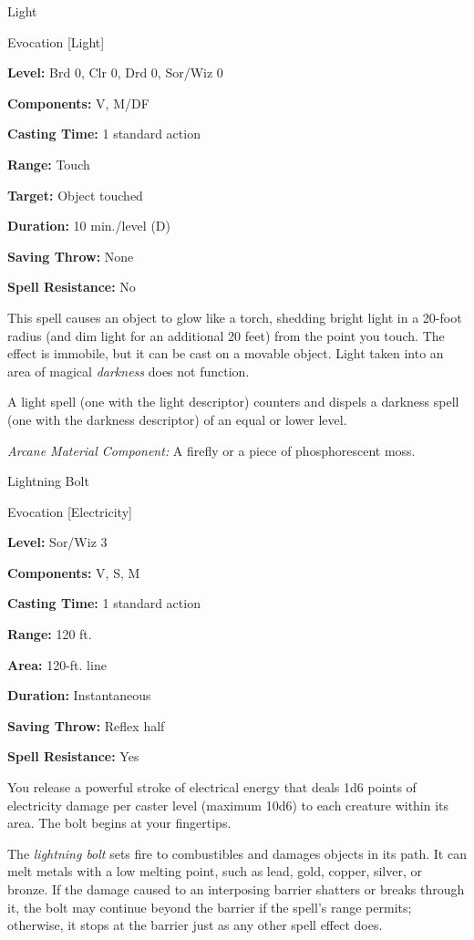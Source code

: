 \documentclass{article}
\begin{document}
\vspace{12pt}
Light

Evocation [Light]

\textbf{Level:} Brd 0, Clr 0, Drd 0, Sor/Wiz 0

\textbf{Components:} V, M/DF

\textbf{Casting Time:} 1 standard action

\textbf{Range:} Touch

\textbf{Target:} Object touched

\textbf{Duration:} 10 min./level (D)

\textbf{Saving Throw:} None

\textbf{Spell Resistance:} No

This spell causes an object to glow like a torch, shedding bright light in a 20-foot 
radius (and dim light for an additional 20 feet) from the point you touch. The 
effect is immobile, but it can be cast on a movable object. Light taken into an 
area of magical \textit{darkness }does not function.

A light spell (one with the light descriptor) counters and dispels a darkness spell 
(one with the darkness descriptor) of an equal or lower level.

\textit{Arcane Material Component: }A firefly or a piece of phosphorescent moss.

\vspace{12pt}
Lightning Bolt

Evocation [Electricity]

\textbf{Level:} Sor/Wiz 3

\textbf{Components:} V, S, M

\textbf{Casting Time:} 1 standard action

\textbf{Range:} 120 ft.

\textbf{Area:} 120-ft. line

\textbf{Duration:} Instantaneous

\textbf{Saving Throw:} Reflex half

\textbf{Spell Resistance:} Yes

You release a powerful stroke of electrical energy that deals 1d6 points of electricity 
damage per caster level (maximum 10d6) to each creature within its area. The bolt 
begins at your fingertips.

The \textit{lightning bolt }sets fire to combustibles and damages objects in its 
path. It can melt metals with a low melting point, such as lead, gold, copper, 
silver, or bronze. If the damage caused to an interposing barrier shatters or breaks 
through it, the bolt may continue beyond the barrier if the spell's range permits; 
otherwise, it stops at the barrier just as any other spell effect does.
\end{document}
